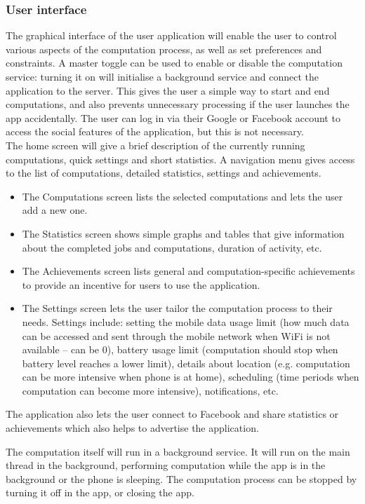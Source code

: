 \documentclass[a4paper,10pt]{article}
\begin{document}
\subsubsection{User interface}
The graphical interface of the user application will enable the user to control various aspects of the computation process, as well as set preferences and constraints. A master toggle can be used to enable or disable the computation service: turning it on will initialise a background service and connect the application to the server. This gives the user a simple way to start and end computations, and also prevents unnecessary processing if the user launches the app accidentally. The user can log in via their Google or Facebook account to access the social features of the application, but this is not necessary. \\
The home screen will give a brief description of the currently running computations, quick settings and short statistics. A navigation menu gives access to the list of computations, detailed statistics, settings and achievements. 
\begin{itemize}
    \item The Computations screen lists the selected computations and lets the user add a new one.
    \item The Statistics screen shows simple graphs and tables that give information about the completed jobs and computations, duration of activity, etc. 
    \item The Achievements screen lists general and computation-specific achievements to provide an incentive for users to use the application.
    \item The Settings screen lets the user tailor the computation process to their needs. Settings include: setting the mobile data usage limit (how much data can be accessed and sent through the mobile network when WiFi is not available – can be 0), battery usage limit (computation should stop when battery level reaches a lower limit), details about location (e.g. computation can be more intensive when phone is at home), scheduling (time periods when computation can become more intensive), notifications, etc.
\end{itemize}
The application also lets the user connect to Facebook and share statistics or achievements which also helps to advertise the application.\par
The computation itself will run in a background service. It will run on the main thread in the background, performing computation while the app is in the background or the phone is sleeping. The computation process can be stopped by turning it off in the app, or closing the app.
\end{document}
